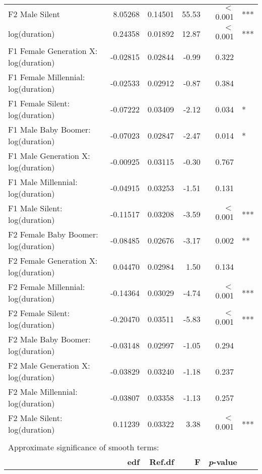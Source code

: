 \begin{table}[ht]
{{\begin{tabular}{l r r r r@{\hskip1pt} @{\hskip0pt}l}
{}F2 Male Silent               &  8.05268 &   0.14501 &  55.53 &      $<$ 0.001 & *** \\
log(duration)                                        &  0.24358 &   0.01892 &  12.87 &      $<$ 0.001 & *** \\
{}F1 Female Generation X: log(duration)        & -0.02815 &   0.02844 &  -0.99 &          0.322 &     \\
{}F1 Female Millennial: log(duration)  & -0.02533 &   0.02912 &  -0.87 &          0.384 &     \\
{}F1 Female Silent: log(duration)      & -0.07222 &   0.03409 &  -2.12 &          0.034 & *   \\
{}F1 Male Baby Boomer: log(duration)      & -0.07023 &   0.02847 &  -2.47 &          0.014 & *   \\
{}F1 Male Generation X: log(duration)        & -0.00925 &   0.03115 &  -0.30 &          0.767 &     \\
{}F1 Male Millennial: log(duration)  & -0.04915 &   0.03253 &  -1.51 &          0.131 &     \\
{}F1 Male Silent: log(duration)      & -0.11517 &   0.03208 &  -3.59 &      $<$ 0.001 & *** \\
{}F2 Female Baby Boomer: log(duration)      & -0.08485 &   0.02676 &  -3.17 &          0.002 & **  \\
{}F2 Female Generation X: log(duration)        &  0.04470 &   0.02984 &   1.50 &          0.134 &     \\
{}F2 Female Millennial: log(duration)  & -0.14364 &   0.03029 &  -4.74 &      $<$ 0.001 & *** \\
{}F2 Female Silent: log(duration)      & -0.20470 &   0.03511 &  -5.83 &      $<$ 0.001 & *** \\
{}F2 Male Baby Boomer: log(duration)      & -0.03148 &   0.02997 &  -1.05 &          0.294 &     \\
{}F2 Male Generation X: log(duration)        & -0.03829 &   0.03240 &  -1.18 &          0.237 &     \\
{}F2 Male Millennial: log(duration)  & -0.03807 &   0.03358 &  -1.13 &          0.257 &     \\
{}F2 Male Silent: log(duration)      &  0.11239 &   0.03322 &   3.38 &       $<$ 0.001 & *** \\
\\
\multicolumn{6}{l}{Approximate significance of smooth terms:}\\
 & \textbf{edf} & \textbf{Ref.df} & \textbf{F} & \multicolumn{2}{l}{\textbf{\textit{p}-value}}\\

\end{tabular}}}
\end{table}
